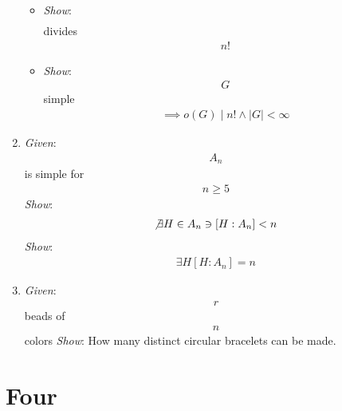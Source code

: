 \begin{enumerate}
  \begin{itemize}
  \tightlist
  \item
    \emph{Show}: \begin{align*}[\text{core}(H) : G]\end{align*} divides
    \begin{align*}n!\end{align*}
  \item
    \emph{Show}: \begin{align*}G\end{align*} simple
    \begin{align*}\implies o(G) \mid n! \wedge |G| < \infty\end{align*}
  \end{itemize}
\item
  \emph{Given}: \begin{align*}A_n\end{align*} is simple for
  \begin{align*}n\geq 5\end{align*} \emph{Show}:
  \begin{align*}\not \exists H \in A_n \ni [H : A_n] < n\end{align*}
  \emph{Show}: \begin{align*}\exists H [H : A_n] = n\end{align*}
\item
  \emph{Given}: \begin{align*}r\end{align*} beads of
  \begin{align*}n\end{align*} colors \emph{Show}: How many distinct
  circular bracelets can be made.
\end{enumerate}

\hypertarget{four}{%
\section{Four}\label{four}}

